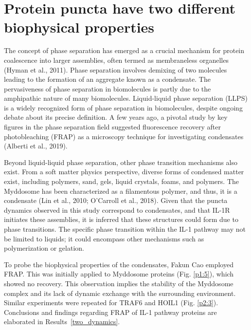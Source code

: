 \section{Protein puncta have two different biophysical properties}
\label{section:biophysics}
The concept of phase separation has emerged as a crucial mechanism for protein coalescence into larger assemblies, often termed as membraneless organelles (Hyman et al., 2011). Phase separation involves demixing of two molecules leading to the formation of an aggregate known as a condensate. The pervasiveness of phase separation in biomolecules is partly due to the amphipathic nature of many biomolecules. Liquid-liquid phase separation (LLPS) is a widely recognized form of phase separation in biomolecules, despite ongoing debate about its precise definition. A few years ago, a pivotal study by key figures in the phase separation field suggested fluorescence recovery after photobleaching (FRAP) as a microscopy technique for investigating condensates (Alberti et al., 2019).

Beyond liquid-liquid phase separation, other phase transition mechanisms also exist. From a soft matter physics perspective, diverse forms of condensed matter exist, including polymers, sand, gels, liquid crystals, foams, and polymers. The Myddosome has been characterized as a filamentous polymer, and thus, it is a condensate (Lin et al., 2010; O’Carroll et al., 2018). Given that the puncta dynamics observed in this study correspond to condensates, and that IL-1R initiates these assemblies, it is inferred that these structures could form due to phase transitions. The specific phase transition within the IL-1 pathway may not be limited to liquids; it could encompass other mechanisms such as polymerization or gelation.

To probe the biophysical properties of the condensates, Fakun Cao employed FRAP. This was initially applied to Myddosome proteins (Fig. \ref{p1:5}), which showed no recovery. This observation implies the stability of the Myddosome complex and its lack of dynamic exchange with the surrounding environment. Similar experiments were repeated for TRAF6 and HOIL1 (Fig. \ref{p2:3}). Conclusions and findings regarding FRAP of IL-1 pathway proteins are elaborated in Results~\ref{two_dynamics}.


